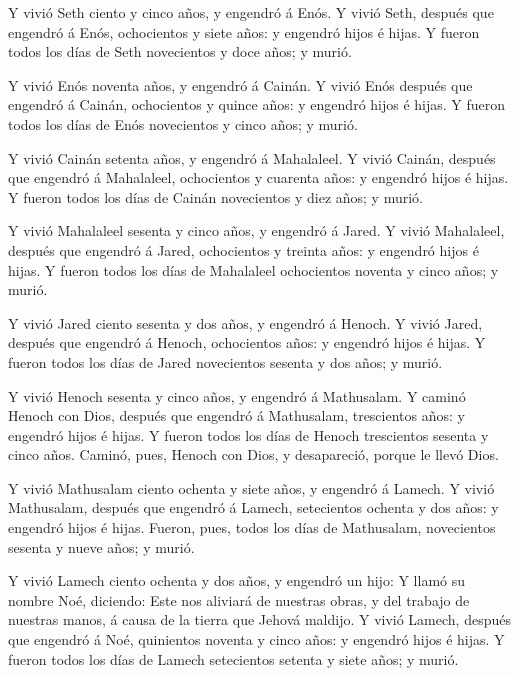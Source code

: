 Y vivió Seth ciento y cinco años, y engendró á Enós.
 Y vivió Seth, después que engendró á Enós, ochocientos y
siete años: y engendró hijos é hijas.  Y fueron todos los
días de Seth novecientos y doce años; y murió.

 Y vivió Enós noventa años, y engendró á Cainán.
 Y vivió Enós después que engendró á Cainán, ochocientos
y quince años: y engendró hijos é hijas.  Y fueron todos
los días de Enós novecientos y cinco años; y murió.

 Y vivió Cainán setenta años, y engendró á Mahalaleel.
 Y vivió Cainán, después que engendró á Mahalaleel,
ochocientos y cuarenta años: y engendró hijos é hijas.  Y
fueron todos los días de Cainán novecientos y diez años; y murió.

 Y vivió Mahalaleel sesenta y cinco años, y engendró á
Jared.  Y vivió Mahalaleel, después que engendró á Jared,
ochocientos y treinta años: y engendró hijos é hijas.  Y
fueron todos los días de Mahalaleel ochocientos noventa y cinco años; y
murió.

 Y vivió Jared ciento sesenta y dos años, y engendró á
Henoch.  Y vivió Jared, después que engendró á Henoch,
ochocientos años: y engendró hijos é hijas.  Y fueron
todos los días de Jared novecientos sesenta y dos años; y murió.

 Y vivió Henoch sesenta y cinco años, y engendró á
Mathusalam.  Y caminó Henoch con Dios, después que
engendró á Mathusalam, trescientos años: y engendró hijos é hijas.
 Y fueron todos los días de Henoch trescientos sesenta y
cinco años.  Caminó, pues, Henoch con Dios, y
desapareció, porque le llevó Dios.

 Y vivió Mathusalam ciento ochenta y siete años, y
engendró á Lamech.  Y vivió Mathusalam, después que
engendró á Lamech, setecientos ochenta y dos años: y engendró hijos é
hijas.  Fueron, pues, todos los días de Mathusalam,
novecientos sesenta y nueve años; y murió.

 Y vivió Lamech ciento ochenta y dos años, y engendró un
hijo:  Y llamó su nombre Noé, diciendo: Este nos aliviará
de nuestras obras, y del trabajo de nuestras manos, á causa de la tierra
que Jehová maldijo.  Y vivió Lamech, después que engendró
á Noé, quinientos noventa y cinco años: y engendró hijos é hijas.
 Y fueron todos los días de Lamech setecientos setenta y
siete años; y murió.

